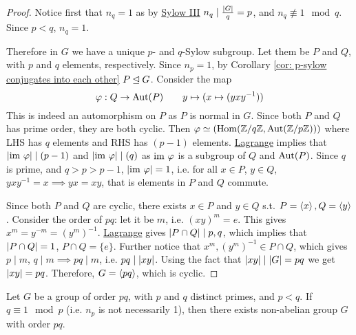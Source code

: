 \begin{proof}
    Notice first that $n_q = 1$ as by \hyperref[thm: Sylow III]{Sylow III} $n_q \mid \frac{\left|G\right|}{q} = p$, and $n_q \nequiv 1 \mod{q}$. Since $p < q$, $n_q = 1$.
    
    Therefore in $G$ we have a unique $p$- and $q$-Sylow subgroup. Let them be $P$ and $Q$, with $p$ and $q$ elements, respectively. Since $n_p = 1$, by Corollary \ref{cor: p-sylow conjugates into each other} $P \unlhd G$. Consider the map
    \[
        \varphi: Q \to \mathrm{Aut}(P) \qquad y \mapsto (x \mapsto (y x y^{-1}))
    \]
    This is indeed an automorphism on $P$ as $P$ is normal in $G$. Since both $P$ and $Q$ has prime order, they are both cyclic. Then $\varphi \simeq (\mathrm{Hom}(\mathbb{Z}/q\mathbb{Z}, \mathrm{Aut}(\mathbb{Z}/p\mathbb{Z})))$ where LHS has $q$ elements and RHS has $(p-1)$ elements. \hyperref[thm: Lagrange]{Lagrange} implies that $\left|\mathrm{im}\  \varphi\right| \mid (p-1)$ and $\left|\mathrm{im}\  \varphi\right| \mid (q)$ as $\mathrm{im}\  \varphi$ is a subgroup of $Q$ and $\mathrm{Aut}(P)$. Since $q$ is prime, and $q > p > p-1$, $\left|\mathrm{im}\  \varphi\right| = 1$, i.e. for all $x \in P$, $y \in Q$, $yxy^{-1} = x \implies yx = xy$, that is elements in $P$ and $Q$ commute. 

    Since both $P$ and $Q$ are cyclic, there exists $x \in P$ and $y \in Q$ s.t. $P = \left\langle x \right\rangle, Q = \left\langle y \right\rangle$. Consider the order of $pq$: let it be $m$, i.e. $(xy)^m = e$. This gives $x^m = y^{-m} = (y^m)^{-1}$. \hyperref[thm: Lagrange]{Lagrange} gives $\left|P \cap Q\right| \mid p, q$, which implies that $\left|P \cap Q\right| = 1$, $P \cap Q = \{e\}$. Further notice that $x^m, (y^m)^{-1} \in P \cap Q$, which gives $p \mid m$, $q \mid m \implies pq \mid m$, i.e. $pq \mid \left|xy\right|$. Using the fact that $\left|xy\right| \mid \left|G\right| = pq$ we get $\left|xy\right| = pq$. Therefore, $G = \left\langle pq \right\rangle$, which is cyclic.
\end{proof}

\begin{proposition}
    Let $G$ be a group of order $pq$, with $p$ and $q$ distinct primes, and $p < q$. If $q \equiv 1 \mod{p}$ (i.e. $n_p$ is not necessarily 1), then there exists non-abelian group $G$ with order $pq$. 
\end{proposition}

